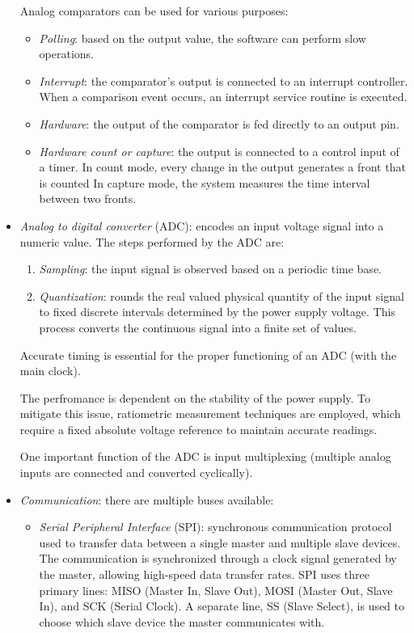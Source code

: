 \begin{itemize}
        Analog comparators can be used for various purposes: 
        \begin{itemize}
            \item \textit{Polling}: based on the output value, the software can perform slow operations.
            \item \textit{Interrupt}: the comparator's output is connected to an interrupt controller. 
                When a comparison event occurs, an interrupt service routine is executed. 
            \item \textit{Hardware}: the output of the comparator is fed directly to an output pin.
            \item \textit{Hardware count or capture}: the output is connected to a control input of a timer. 
                In count mode, every change in the output generates a front that is counted
                In capture mode, the system measures the time interval between two fronts. 
        \end{itemize}
    \item \textit{Analog to digital converter} (ADC): encodes an input voltage signal into a numeric value. 
        The steps performed by the ADC are:
        \begin{enumerate}
            \item \textit{Sampling}: the input signal is observed based on a periodic time base. 
            \item \textit{Quantization}: rounds the real valued physical quantity of the input signal to fixed discrete intervals determined by the power supply voltage. 
                This process converts the continuous signal into a finite set of values.
        \end{enumerate}
        Accurate timing is essential for the proper functioning of an ADC (with the main clock). 

        The perfromance is dependent on the stability of the power supply. 
        To mitigate this issue, ratiometric measurement techniques are employed, which require a fixed absolute voltage reference to maintain accurate readings.

        One important function of the ADC is input multiplexing (multiple analog inputs are connected and converted cyclically). 
    \item \textit{Communication}: there are multiple buses available: 
        \begin{itemize}
            \item \textit{Serial Peripheral Interface} (SPI): synchronous communication protocol used to transfer data between a single master and multiple slave devices.
                The communication is synchronized through a clock signal generated by the master, allowing high-speed data transfer rates. 
                SPI uses three primary lines: MISO (Master In, Slave Out), MOSI (Master Out, Slave In), and SCK (Serial Clock). 
                A separate line, SS (Slave Select), is used to choose which slave device the master communicates with.


\end{itemize}
\end{itemize}
